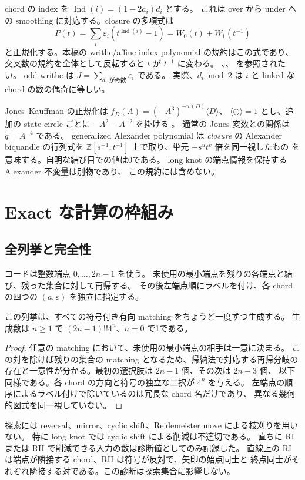 \documentclass[12pt]{amsart}
\theoremstyle{definition}
\theoremstyle{remark}
\numberwithin{equation}{section}
\newcommand{\Z}{\mathbb{Z}}
\newcommand{\eps}{\varepsilon}
\begin{document}
chord の index を $\operatorname{Ind}(i)=(1-2a_i)d_i$ とする。
これは over から under への smoothing に対応する。closure の多項式は
\begin{equation}\label{ja:P}
P(t)=\sum_i\eps_i(t^{\operatorname{Ind}(i)}-1)
=W_0(t)+W_1(t^{-1})
\end{equation}
と正規化する。本稿の writhe/affine-index polynomial の規約はこの式であり、
交叉数の規約を全体として反転すると $t$ が $t^{-1}$ に変わる。
\cite[\S2.2]{Cheng}、\cite[\S3]{Affine}、
\cite[Proposition 10.1]{NNSW1} を参照されたい。
odd writhe は $J=\sum_{d_i\text{ が奇数}}\eps_i$ である。
実際、$d_i\bmod2$ は $i$ と linked な chord の数の偶奇に等しい。

Jones--Kauffman の正規化は
$f_D(A)=(-A^3)^{-w(D)}\langle D\rangle$、
$\langle\bigcirc\rangle=1$ とし、追加の state circle ごとに
$-A^2-A^{-2}$ を掛ける \cite[\S5]{Kauffman}。
通常の Jones 変数との関係は $q=A^{-4}$ である。
generalized Alexander polynomial は
\emph{closure} の Alexander biquandle の行列式を
$\Z[s^{\pm1},t^{\pm1}]$ 上で取り、単元 $\pm s^ut^v$ 倍を同一視したもの
\cite[\S3]{KR} を意味する。自明な結び目での値は0である。
long knot の端点情報を保持する Alexander 不変量は別物であり、
この規約には含めない。

\section{Exact な計算の枠組み}
\subsection{全列挙と完全性}
コードは整数端点 $0,\ldots,2n-1$ を使う。
未使用の最小端点を残りの各端点と結び、残った集合に対して再帰する。
その後左端点順にラベルを付け、各 chord の四つの $(a,\eps)$ を独立に指定する。
\begin{jlem}[列挙の完全性]\label{ja:exhaustive}
この列挙は、すべての符号付き有向 matching をちょうど一度ずつ生成する。
生成数は $n\ge1$ で $(2n-1)!!4^n$、$n=0$ で1である。
\end{jlem}
\begin{proof}
任意の matching において、未使用の最小端点の相手は一意に決まる。
この対を除けば残りの集合の matching となるため、帰納法で対応する再帰分岐の
存在と一意性が分かる。最初の選択肢は $2n-1$ 個、その次は $2n-3$ 個、
以下同様である。各 chord の方向と符号の独立な二択が $4^n$ を与える。
左端点の順序によるラベル付けで除いているのは冗長な chord 名だけであり、
異なる幾何的図式を同一視していない。
\end{proof}
探索には reversal、mirror、cyclic shift、Reidemeister move による枝刈りを用いない。
特に long knot では cyclic shift による削減は不適切である。
直ちに RI または RII で削減できる入力の数は診断値としてのみ記録した。
直線上の RI は端点が隣接する chord、RII は符号が反対で、矢印の始点同士と
終点同士がそれぞれ隣接する対である。この診断は探索集合に影響しない。
\end{document}
